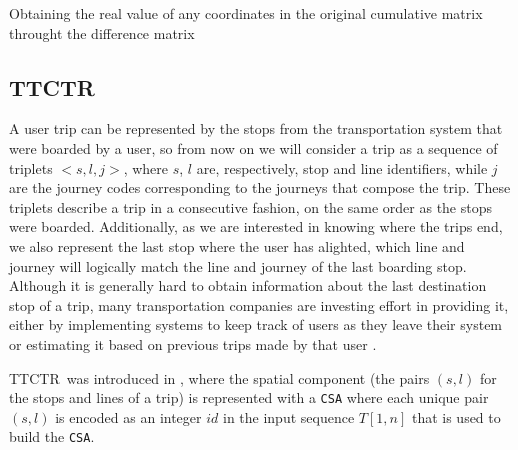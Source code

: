 \documentclass[runningheads]{llncs}
\newcommand{\ttctr}{TTCTR}
\begin{document}
\begin{algorithm}[hbt!]

 
 
 \caption{Obtaining the real value of any coordinates in the original cumulative matrix throught the difference matrix}
 \label{alg:unblock}
\end{algorithm}



\subsection{\ttctr}
\label{sec:ttctr}
A user trip can be represented by the stops from the transportation system that were boarded by a user, so from now on we will consider a trip as a sequence of triplets $<s,l,j>$, where $s$, $l$ are, respectively, stop and line identifiers, while $j$ are the journey codes corresponding to the journeys that compose the trip. These triplets describe a trip in a consecutive fashion, on the same order as the stops were boarded. Additionally, as we are interested in knowing where the trips end, we also represent the last stop where the user has alighted, which line and journey will logically match the line and journey of the last boarding stop. Although it is generally hard to obtain information about the last destination stop of a trip, many transportation companies are investing effort in providing it, either by implementing systems to keep track of users as they leave their system or estimating it based on previous trips made by that user \cite{alsger2016validating}.

\ttctr~was introduced in \cite{brisaboa2018new}, where the spatial component (the pairs $(s,l)$ for the stops and lines of a trip) is represented with a \texttt{CSA} where each unique pair $(s,l)$ is encoded as an integer $id$ in the input sequence $T[1,n]$ that is used to build the \texttt{CSA}.
\end{document}
